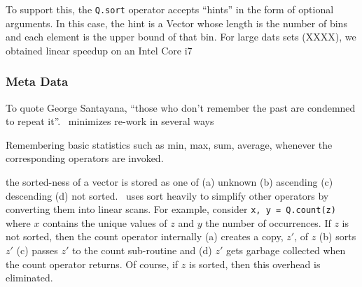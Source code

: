 To support this, the {\tt Q.sort} operator accepts ``hints'' in the form of
optional arguments. In this case, the hint is a Vector whose length is the
number of bins and each element is the upper bound of that bin. For large dats
sets (XXXX), we obtained linear speedup on an Intel Core i7 

\subsubsection{Meta Data}

To quote George Santayana, ``those who don't remember the past are condemned to
repeat it''.  \Q\ minimizes re-work in several ways
\be
\item 
Remembering basic statistics such as min, max, sum, average, whenever the
corresponding operators are invoked. 
\item the sorted-ness of a vector is
stored as one of (a) unknown (b) ascending (c) descending (d) not sorted. \Q\
uses sort heavily to simplify other operators by converting them into linear
scans. For example, consider {\tt x, y  = Q.count(z)} where \(x\) contains the
unique values of \(z\) and \(y\) the number of occurrences. If \(z\) is not
sorted, then the count operator internally (a) creates a copy, \(z'\), of \(z\)
(b) sorts \(z'\) (c) passes \(z'\) to the count sub-routine and (d) \(z'\) gets
garbage collected when the count operator returns. Of course, if \(z\) is
sorted, then this overhead is eliminated.

\ee
